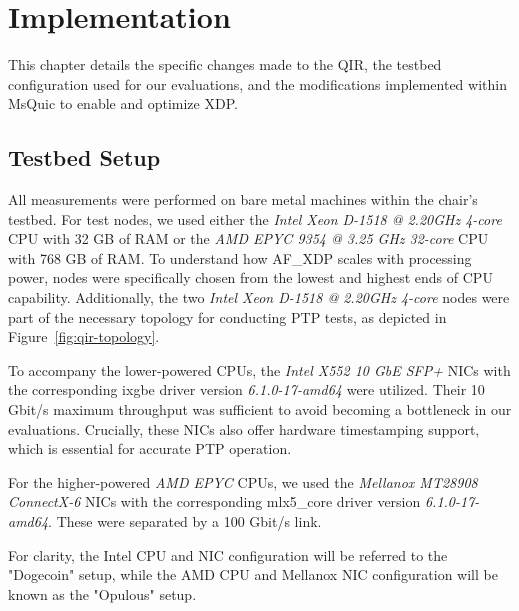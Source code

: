 \chapter{Implementation}
\label{chap:implementation}
This chapter details the specific changes made to the \ac{QIR}, the testbed configuration used for our evaluations, and the modifications implemented within MsQuic to enable and optimize \ac{XDP}.

\section{Testbed Setup}
\label{sec:testbed-setup}
All measurements were performed on bare metal machines within the chair's testbed.  For test nodes, we used either the \emph{Intel Xeon D-1518 @ 2.20GHz 4-core} CPU with 32 GB of RAM or the \emph{AMD EPYC 9354 @ 3.25 GHz 32-core} CPU with 768 GB of RAM. To understand how AF\_XDP scales with processing power, nodes were specifically chosen from the lowest and highest ends of CPU capability. Additionally, the two \emph{Intel Xeon D-1518 @ 2.20GHz 4-core} nodes were part of the necessary topology for conducting \ac{PTP} tests, as depicted in Figure~\ref{fig:qir-topology}.

To accompany the lower-powered CPUs, the \emph{Intel X552 10 GbE SFP+} \ac{NIC}s with the corresponding ixgbe driver version \emph{6.1.0-17-amd64} were utilized. Their 10 Gbit/s maximum throughput was sufficient to avoid becoming a bottleneck in our evaluations. Crucially, these \ac{NIC}s also offer hardware timestamping support, which is essential for accurate \ac{PTP} operation. 

For the higher-powered \emph{AMD EPYC} CPUs, we used the \emph{Mellanox MT28908 ConnectX-6} \ac{NIC}s with the corresponding mlx5\_core driver version \emph{6.1.0-17-amd64}. These were separated by a 100 Gbit/s link.

For clarity, the Intel CPU and NIC configuration will be referred to the "Dogecoin" setup, while the AMD CPU and Mellanox NIC configuration will be known as the "Opulous" setup.


